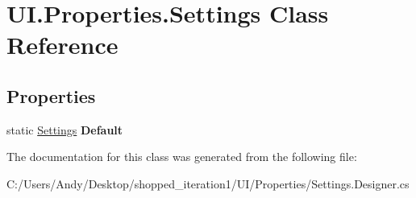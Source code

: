 \hypertarget{class_u_i_1_1_properties_1_1_settings}{
\section{UI.Properties.Settings Class Reference}
\label{class_u_i_1_1_properties_1_1_settings}
}
\subsection*{Properties}
\begin{DoxyCompactItemize}
\item 
\hypertarget{class_u_i_1_1_properties_1_1_settings_a7a6b860b0eecc69e41cd7b817271540a}{
static \hyperlink{class_u_i_1_1_properties_1_1_settings}{Settings} {\bfseries Default}}
\label{class_u_i_1_1_properties_1_1_settings_a7a6b860b0eecc69e41cd7b817271540a}

\end{DoxyCompactItemize}


The documentation for this class was generated from the following file:\begin{DoxyCompactItemize}
\item 
C:/Users/Andy/Desktop/shopped\_\-iteration1/UI/Properties/Settings.Designer.cs\end{DoxyCompactItemize}
